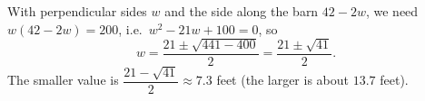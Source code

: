 With perpendicular sides $w$ and the side along the barn $42-2w$, we need $w(42-2w)=200$, i.e.\ $w^2-21w+100=0$, so
\[
w=\dfrac{21\pm\sqrt{441-400}}{2}=\dfrac{21\pm\sqrt{41}}{2}.
\]
The smaller value is $\dfrac{21-\sqrt{41}}{2}\approx\boxed{7.3}$ feet (the larger is about $13.7$ feet).
